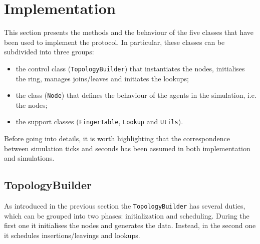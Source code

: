 \documentclass[11pt,twocolumn,letterpaper]{article}
\begin{document}
	\section{Implementation}
	\label{sec:implementation}
	This section presents the methods and the behaviour of the five classes that have been used to implement the protocol. In particular, these classes can be subdivided into three groups:
	\begin{itemize}
		\item the control class (\texttt{TopologyBuilder}) that instantiates the nodes, initialises the ring, manages joins/leaves and initiates the lookups;
		\item the class (\texttt{Node}) that defines the behaviour of the agents in the simulation, i.e. the nodes;
		\item the support classes (\texttt{FingerTable}, \texttt{Lookup} and \texttt{Utils}).
	\end{itemize}
	Before going into details, it is worth highlighting that the correspondence between simulation ticks and seconds has been assumed in both implementation and simulations. 
	
	\subsection{TopologyBuilder}
	\label{subsec:topbuilder}
	As introduced in the previous section the \texttt{TopologyBuilder} has several duties, which can be grouped into two phases: initialization and scheduling. During the first one it initialises the nodes and generates the data. Instead, in the second one it schedules insertions/leavings and lookups.
	
\end{document}
